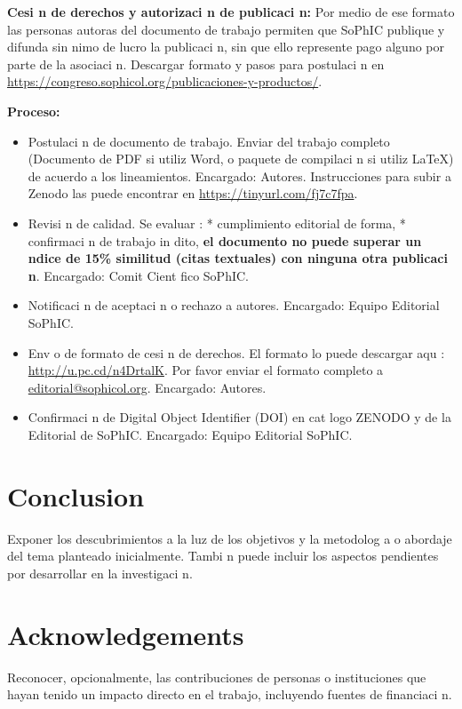 \documentclass{article}
\begin{document}
\textbf{Cesi n de derechos y autorizaci n de publicaci n:} Por medio de ese formato las personas autoras del documento de trabajo permiten que SoPhIC publique y difunda sin  nimo de lucro la publicaci n, sin que ello represente pago alguno por parte de la asociaci n. Descargar formato y pasos para postulaci n en \url{https://congreso.sophicol.org/publicaciones-y-productos/}. 

\textbf{Proceso:}

\begin{itemize}
\item Postulaci n de documento de trabajo. Enviar del trabajo completo (Documento de PDF si utiliz  Word, o paquete de compilaci n si utiliz  \LaTeX\xspace) de acuerdo a los lineamientos. Encargado: Autores. Instrucciones para subir a Zenodo las puede encontrar en \url{https://tinyurl.com/fj7c7fpa}.
\item Revisi n de calidad. Se evaluar : * cumplimiento editorial de forma, * confirmaci n de trabajo in dito, \textbf{el documento no puede superar un  ndice de 15\% similitud (citas textuales) con ninguna otra publicaci n}. Encargado: Comit  Cient fico SoPhIC. 
\item  Notificaci n de aceptaci n o rechazo a autores. Encargado: Equipo Editorial SoPhIC. 
\item  Env o de formato de cesi n de derechos. El formato lo puede descargar aqu : \url{http://u.pc.cd/n4DrtalK}. Por favor enviar el formato completo a \href{mailto:editorial@sophicol.org}{editorial@sophicol.org}. Encargado: Autores.
\item  Confirmaci n de Digital Object Identifier (DOI) en cat logo ZENODO y de la Editorial de SoPhIC. Encargado: Equipo Editorial SoPhIC. 
\end{itemize}

\section{Conclusion}
Exponer los descubrimientos a la luz de los objetivos y la metodolog a o abordaje del tema planteado inicialmente. Tambi n puede incluir los aspectos pendientes por desarrollar en la investigaci n. 

\section{Acknowledgements}
Reconocer, opcionalmente, las contribuciones de personas o instituciones que hayan tenido un impacto directo en el trabajo, incluyendo fuentes de financiaci n. 

\printbibliography %
\end{document}
